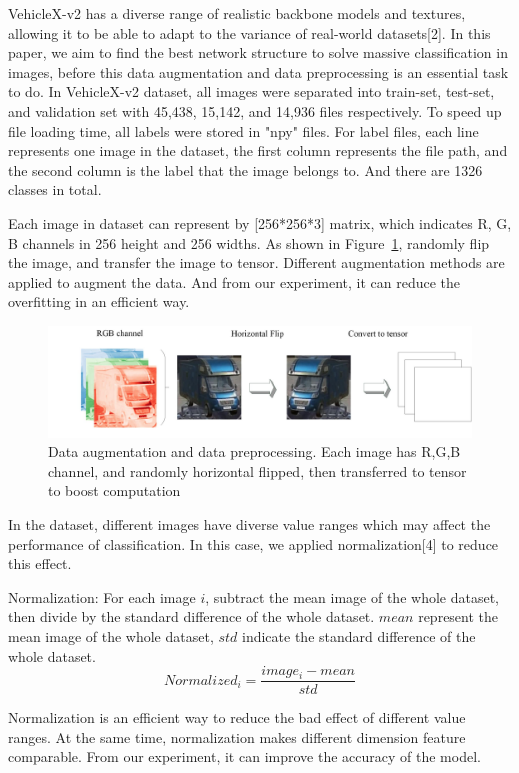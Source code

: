 \documentclass[runningheads]{llncs}
\begin{document}
VehicleX-v2 has a diverse range of realistic backbone models and textures, allowing it to be able to adapt to the variance of real-world datasets[2]. In this paper, we aim to find the best network structure to solve massive classification in images, before this data augmentation and data preprocessing is an essential task to do. In VehicleX-v2 dataset, all images were separated into train-set, test-set, and validation set with 45,438, 15,142, and 14,936 files respectively. To speed up file loading time, all labels were stored in "npy" files. For label files, each line represents one image in the dataset, the first column represents the file path, and the second column is the label that the image belongs to. And there are 1326 classes in total.

Each image in dataset can represent by [256*256*3] matrix, which indicates R, G, B channels in 256 height and 256 widths. As shown in Figure~\ref{fig1}, randomly flip the image, and transfer the image to tensor. Different augmentation methods are applied to augment the data. And from our experiment, it can reduce the overfitting in an efficient way.
\begin{figure}
	\includegraphics[width=\linewidth]{augmation.jpg}
	\caption{Data augmentation and data preprocessing. Each image has R,G,B channel, and randomly horizontal flipped, then transferred to tensor to boost computation}
	\label{fig1}
\end{figure}

In the dataset, different images have diverse value ranges which may affect the performance of classification. In this case, we applied normalization[4] to reduce this effect.

Normalization: For each image $i$, subtract the mean image of the whole dataset, then divide by the standard difference of the whole dataset. $mean$ represent the mean image of the whole dataset, $std$ indicate the standard difference of the whole dataset.
\begin{equation}
	Normalized_i=\frac{image_i-mean}{std}
\end{equation}

Normalization is an efficient way to reduce the bad effect of different value ranges. At the same time, normalization makes different dimension feature comparable. From our experiment, it can improve the accuracy of the model.
\end{document}
